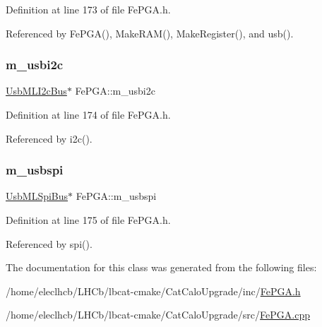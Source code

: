 Definition at line 173 of file Fe\+P\+G\+A.\+h.



Referenced by Fe\+P\+G\+A(), Make\+R\+A\+M(), Make\+Register(), and usb().

\mbox{\label{classFePGA_a09fdde4002008daa0d15672772dd4483}} 
\subsubsection{\texorpdfstring{m\+\_\+usbi2c}{m\_usbi2c}}
{\footnotesize\ttfamily \hyperlink{classUsbMLI2cBus}{Usb\+M\+L\+I2c\+Bus}$\ast$ Fe\+P\+G\+A\+::m\+\_\+usbi2c\hspace{0.3cm}{\ttfamily [private]}}



Definition at line 174 of file Fe\+P\+G\+A.\+h.



Referenced by i2c().

\mbox{\label{classFePGA_a922a56250b29c9842cdb8095cae8c976}} 
\subsubsection{\texorpdfstring{m\+\_\+usbspi}{m\_usbspi}}
{\footnotesize\ttfamily \hyperlink{classUsbMLSpiBus}{Usb\+M\+L\+Spi\+Bus}$\ast$ Fe\+P\+G\+A\+::m\+\_\+usbspi\hspace{0.3cm}{\ttfamily [private]}}



Definition at line 175 of file Fe\+P\+G\+A.\+h.



Referenced by spi().



The documentation for this class was generated from the following files\+:\begin{DoxyCompactItemize}
\item 
/home/eleclhcb/\+L\+H\+Cb/lbcat-\/cmake/\+Cat\+Calo\+Upgrade/inc/\hyperlink{FePGA_8h}{Fe\+P\+G\+A.\+h}\item 
/home/eleclhcb/\+L\+H\+Cb/lbcat-\/cmake/\+Cat\+Calo\+Upgrade/src/\hyperlink{FePGA_8cpp}{Fe\+P\+G\+A.\+cpp}\end{DoxyCompactItemize}
